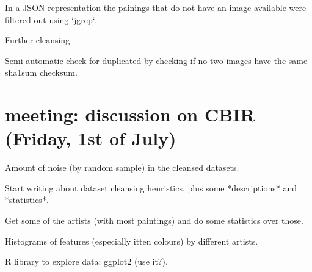 \documentclass[a4paper,twocolumn]{article}
\begin{document}
In a JSON representation the painings that do not have an image available were
filtered out using `jgrep`.

Further cleansing
-----------------

Semi automatic check for duplicated by checking if no two images have the same
sha1sum checksum.

\section{meeting: discussion on CBIR (Friday, 1st of July)}

Amount of noise (by random sample) in the cleansed datasets.

Start writing about dataset cleansing heuristics, plus some *descriptions* and
*statistics*.

Get some of the artists (with most paintings) and do some statistics over
those.

Histograms of features (especially itten colours) by different artists.

R library to explore data: ggplot2 (use it?).



%








\end{document}
